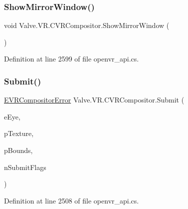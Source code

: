 \subsubsection{\texorpdfstring{ShowMirrorWindow()}{ShowMirrorWindow()}}
{\footnotesize\ttfamily void Valve.\+V\+R.\+C\+V\+R\+Compositor.\+Show\+Mirror\+Window (\begin{DoxyParamCaption}{ }\end{DoxyParamCaption})}



Definition at line 2599 of file openvr\+\_\+api.\+cs.

\mbox{\label{class_valve_1_1_v_r_1_1_c_v_r_compositor_a7976402c028a04424c1c8c2afc7352cf}} 
\subsubsection{\texorpdfstring{Submit()}{Submit()}}
{\footnotesize\ttfamily \mbox{\hyperlink{namespace_valve_1_1_v_r_ac34ee1034fda668ccd45f57676ded81b}{E\+V\+R\+Compositor\+Error}} Valve.\+V\+R.\+C\+V\+R\+Compositor.\+Submit (\begin{DoxyParamCaption}\item[{\mbox{\hyperlink{namespace_valve_1_1_v_r_a8153d4a3e627e1cede046327087c1880}{E\+V\+R\+Eye}}}]{e\+Eye,  }\item[{ref \mbox{\hyperlink{struct_valve_1_1_v_r_1_1_texture__t}{Texture\+\_\+t}}}]{p\+Texture,  }\item[{ref \mbox{\hyperlink{struct_valve_1_1_v_r_1_1_v_r_texture_bounds__t}{V\+R\+Texture\+Bounds\+\_\+t}}}]{p\+Bounds,  }\item[{\mbox{\hyperlink{namespace_valve_1_1_v_r_ad103abad1c8abaa4b384eccf2605265f}{E\+V\+R\+Submit\+Flags}}}]{n\+Submit\+Flags }\end{DoxyParamCaption})}



Definition at line 2508 of file openvr\+\_\+api.\+cs.

\mbox{\label{class_valve_1_1_v_r_1_1_c_v_r_compositor_a0e8337d82a7bad865f61247681800e54}} 
